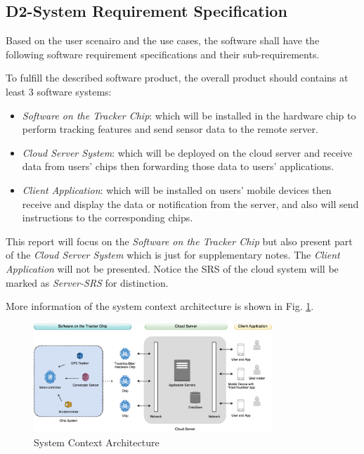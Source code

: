 \documentclass[technote, transmag, onecolumn, 9pt]{IEEEtran}
\begin{document}
\subsection*{\textbf{D2-System Requirement Specification}}

Based on the user scenairo and the use cases,
the software shall have the following software requirement specifications and their sub-requirements.

To fulfill the described software product, the overall product should contains at least 3 software systems:

\begin{itemize}
	\item \textit{Software on the Tracker Chip}: which will be installed in the hardware chip to perform tracking features
	      and send sensor data to the remote server.
	\item \textit{Cloud Server System}: which will be deployed on the cloud server and receive data from users' chips
	      then forwarding those data to users' applications.
	\item \textit{Client Application}: which will be installed on users' mobile devices
	      then receive and display the data or notification from the server,
	      and also will send instructions to the corresponding chips.
\end{itemize}

This report will focus on the \textit{Software on the Tracker Chip}
but also present part of the \textit{Cloud Server System} which is just for supplementary notes.
The \textit{Client Application} will not be presented.
Notice the SRS of the cloud system will be marked as \textit{Server-SRS} for distinction.

More information of the system context architecture is shown in Fig. \ref{fig:sys-context}.

\begin{figure}[!ht]
	\centering
	\includegraphics[width=0.8\textwidth]{./img/f2-sys-context.png}
	\caption{System Context Architecture}
	\label{fig:sys-context}
\end{figure}
\end{document}
